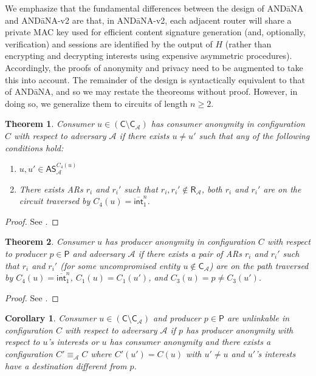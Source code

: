 \documentclass[10pt]{article}
\newtheorem{thm}{\textbf{Theorem}}
\newtheorem{cor}{\textbf{Corollary}}
\begin{document}
We emphasize that the fundamental differences between the design of {\sf AND\=aNA} and {\sf AND\=aNA-v2} are that, in {\sf AND\=aNA-v2}, each adjacent router will share a private MAC key used for efficient content signature generation (and, optionally, verification) and sessions are identified by the output of $H$ (rather than encrypting and decrypting interests using expensive asymmetric procedures). Accordingly, the proofs of anonymity and privacy need to be augmented to take this into account. The remainder of the design is syntactically equivalent to that of {\sf AND\=aNA}, and so we may restate the theoreoms without proof. However, in doing so, we generalize them to circuits of length $n \geq 2$. 

\begin{thm}
Consumer $u \in (\mathsf{C} \setminus \mathsf{C}_{\mathcal{A}})$ has consumer anonymity in configuration $C$ with respect to adversary $\mathcal{A}$ if there exists $u \not= u'$ such that any of the following conditions hold:
\begin{enumerate}
	\item $u, u' \in \mathsf{AS}_{\mathcal{A}}^{C_4(u)}$
	\item There exists ARs $r_i$ and $r_i'$ such that $r_i,r_i' \notin \mathsf{R}_{\mathcal{A}}$, both $r_i$ and $r_i'$ are on the circuit traversed by $C_4(u) = \overline{\mathsf{int}}_1^n$.
\end{enumerate}
\end{thm}
\begin{proof}
See \cite{andana}.
\end{proof}

\begin{thm}
Consumer $u$ has producer anonymity in configuration $C$ with respect to producer $p \in \mathsf{P}$ and adversary $\mathcal{A}$ if there exists a pair of ARs $r_i$ and $r_i'$ such that $r_i$ and $r_i'$ (for some uncompromised entity $u \notin \mathsf{C}_{\mathcal{A}}$) are on the path traversed by $C_4(u) = \overline{\mathsf{int}}_1^n$, $C_1(u) = C_1(u')$, and $C_3(u) = p \not= C_3(u')$.
\end{thm}
\begin{proof}
See \cite{andana}.
\end{proof}

\begin{cor}
Consumer $u \in (\mathsf{C} \setminus \mathsf{C}_{\mathcal{A}})$ and producer $p \in \mathsf{P}$ are unlinkable in configuration $C$ with respect to adversary $\mathcal{A}$ if $p$ has producer anonymity with respect to $u$'s interests or $u$ has consumer anonymity and there exists a configuration $C' \equiv_{\mathcal{A}} C$ where $C'(u') = C(u)$ with $u' \not= u$ and $u'$'s interests have a destination different from $p$. 
\end{cor}
\end{document}
